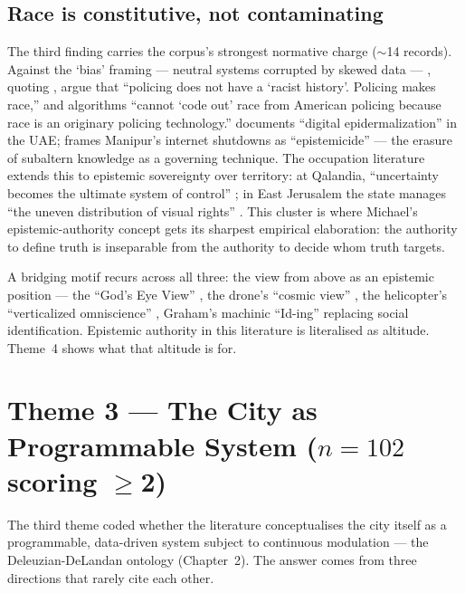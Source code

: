 \subsection{Race is constitutive, not contaminating}

The third finding carries the corpus's strongest normative charge ($\sim$14 records). Against the `bias' framing — neutral systems corrupted by skewed data — \textcite[p.~279]{sharma2024}, quoting \textcite{scannell2019}, argue that ``policing does not have a `racist history'. Policing makes race,'' and algorithms ``cannot `code out' race from American policing because race is an originary policing technology.'' \textcite[p.~4]{ziadah2021} documents ``digital epidermalization'' in the UAE; \textcite[p.~11]{irungbam2026} frames Manipur's internet shutdowns as ``epistemicide'' — the erasure of subaltern knowledge as a governing technique. The occupation literature extends this to epistemic sovereignty over territory: at Qalandia, ``uncertainty becomes the ultimate system of control'' \parencite[p.~8]{tawil2011}; in East Jerusalem the state manages ``the uneven distribution of visual rights'' \parencite[p.~5]{shalhoub2017}. This cluster is where Michael's \citeyearpar{michael2007} epistemic-authority concept gets its sharpest empirical elaboration: the authority to define truth is inseparable from the authority to decide whom truth targets.

A bridging motif recurs across all three: the view from above as an epistemic position — the ``God's Eye View'' \parencite{lyon2014}, the drone's ``cosmic view'' \parencite[p.~241]{wall2011}, the helicopter's ``verticalized omniscience'' \parencite[p.~54]{adey2010}, Graham's \citeyearpar[p.~143]{graham2012} machinic ``Id-ing'' replacing social identification. Epistemic authority in this literature is literalised as altitude. Theme~4 shows what that altitude is for.

\section{Theme 3 — The City as Programmable System (\texorpdfstring{$n=102$ scoring $\geq$2}{n=102 scoring ≥2})}
\label{sec:theme3}

The third theme coded whether the literature conceptualises the city itself as a programmable, data-driven system subject to continuous modulation — the Deleuzian-DeLandan ontology (Chapter~2). The answer comes from three directions that rarely cite each other.

